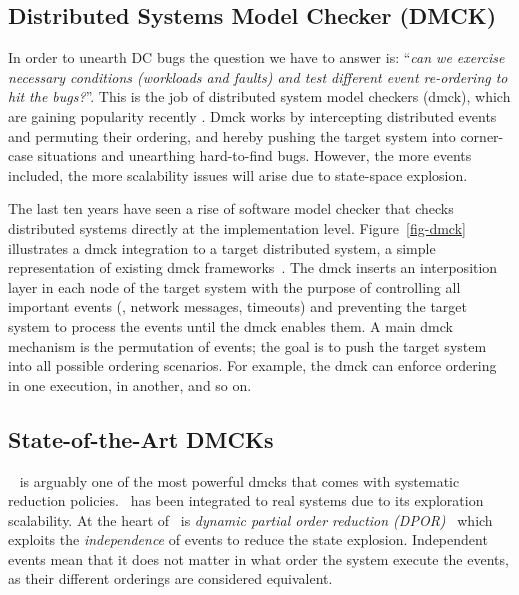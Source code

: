 \subsection{Distributed Systems Model Checker (DMCK)}
\label{sec-bg-dmck}

In order to unearth DC bugs the question we have to answer is: ``{\em can we
exercise necessary conditions (\ie workloads and faults) and test different
event re-ordering to hit the bugs?}''. This is the job of distributed system
model checkers (dmck), which are gaining popularity recently
\cite{Guo+11-Demeter, Killian+07-LifeDeathMaceMC, Simsa+10-Dbug,
Yang+09-Modist}. Dmck works by intercepting distributed events and permuting
their ordering, and hereby pushing the target system into corner-case situations
and unearthing hard-to-find bugs. However, the more events included, the more
scalability issues will arise due to state-space explosion.



The last ten years have seen a rise of software model checker that checks
distributed systems directly at the implementation level.  Figure~\ref{fig-dmck}
illustrates a dmck integration to a target distributed system, a simple
representation of existing dmck frameworks~\cite{Guo+11-Demeter,
Killian+07-LifeDeathMaceMC, Simsa+10-Dbug, Yang+09-Modist}.  The dmck inserts an
interposition layer in each node of the target system with the purpose of
controlling all important events (\eg, network messages, timeouts) and
preventing the target system to process the events until the dmck enables them.
A main dmck mechanism is the permutation of events; the goal is to push the
target system into all possible ordering scenarios.  For example, the dmck can
enforce  ordering in one execution,  in another, and so on.


\subsection{State-of-the-Art DMCKs}

\modist~\cite{Yang+09-Modist} is arguably one of the most powerful
dmcks that comes with systematic reduction policies.  \modist\ has been
integrated to real systems due to its exploration
scalability.  At the heart of \modist\ is {\em dynamic partial order
  reduction (DPOR)}~\cite{Flanagan+05-Dpor} which exploits the {\em
  independence} of events to reduce the state explosion.  Independent
events mean that it does not matter in what order the system execute
the events, as their different orderings are considered equivalent.

